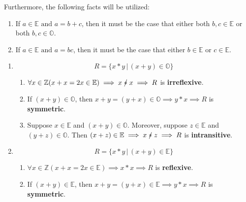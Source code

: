 \documentclass[12pt]{article}
\newcommand{\p}[1]{\item[\textnormal{(#1)}]}
\newcommand{\nir}{\mathrel{\mathrlap{/}*}}
\newenvironment{ps}
{\begin{enumerate}[leftmargin=0em, itemindent=1.5em]}
{\end{enumerate}}
\begin{document}
Furthermore, the following facts will be utilized:
\begin{enumerate}

    \item If \(a \in \mathbb{E} \text{ and } a = b + c \), then it must be the case that either both
        \( b,c \in \mathbb{E} \) or both \( b,c \in \mathbb{O} \).

    \item If \(a \in \mathbb{E} \text{ and } a = bc \), then it must be the case that either
        \( b \in \mathbb{E} \text{ or } c \in \mathbb{E} \).

\end{enumerate}


\begin{ps}

    \p{i}
        \[
            R = \{ x*y \,|\, (x+y) \in \mathbb{O} \}
        \]   

        \begin{enumerate}[label=\arabic*.]

            \item \(\forall x \in \mathbb{Z} (x + x = 2x \in \mathbb{E}) \implies x \nir x \implies
                R \) is \textbf{irreflexive}.

            \item If \( (x+y) \in \mathbb{O} \), then \( x+y = (y+x) \in \mathbb{O} \implies y*x
                \implies R \) is \textbf{symmetric}.

            \item Suppose \( x \in \mathbb{E} \) and \( (x+y) \in \mathbb{O} \). Moreover, suppose
                \( z \in \mathbb{E} \) and \( (y+z) \in \mathbb{O} \). Then \( (x+z) \in \mathbb{E}
                \implies x \nir z \implies R \)  is \textbf{intransitive}.

        \end{enumerate}

    \newpage

    \p{ii}
        \[
            R = \{ x*y \,|\, (x+y) \in \mathbb{E} \}
        \]   

        \begin{enumerate}[label=\arabic*.]

            \item \(\forall x \in \mathbb{Z} (x + x = 2x \in \mathbb{E}) \implies x * x
                \implies R \) is \textbf{reflexive}.

            \item If \( (x+y) \in \mathbb{E} \), then \( x+y = (y+x) \in \mathbb{E} \implies
                y*x \implies R \) is \textbf{symmetric}.
            

\end{enumerate}
\end{ps}
\end{document}
